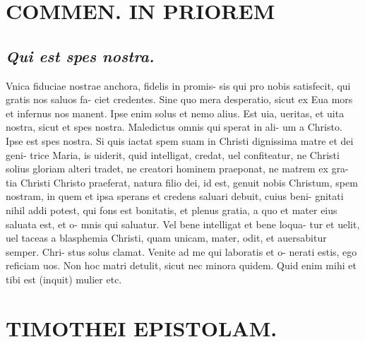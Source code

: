 \documentclass{article}
\begin{document}
\begin{pages}
\section*{COMMEN. IN PRIOREM }
\marginpar{[ p.6 ]}
{}
\subsection*{\textit{Qui est spes nostra. }}\pstart Vnica fiduciae nostrae anchora, fidelis in promis- sis qui pro nobis satisfecit, qui gratis nos saluos fa- ciet credentes. Sine quo mera desperatio, sicut ex Eua mors et infernus nos manent. Ipse enim solus et nemo alius. Est uia, ueritas, et uita nostra, sicut et spes nostra. Maledictus omnis qui sperat in ali- um a Christo. Ipse est spes nostra. Si quis iactat spem suam in Christi dignissima matre et dei geni- trice Maria, is uiderit, quid intelligat, credat, uel confiteatur, ne Christi solius gloriam alteri tradet, ne creatori hominem praeponat, ne matrem ex gra- tia Christi Christo praeferat, natura filio dei, id est, genuit nobis Christum, spem nostram, in quem et ipsa sperans et credens saluari debuit, cuius beni- gnitati nihil addi potest, qui fons est bonitatis, et plenus gratia, a quo et mater eius saluata est, et o- mnis qui saluatur. Vel bene intelligat et bene loqua- tur et uelit, uel taceas a blasphemia Christi, quam unicam, mater, odit, et auersabitur semper. Chri- stus solus clamat. Venite ad me qui laboratis et o- nerati estis, ego reficiam uos. Non hoc matri detulit, sicut nec minora quidem. Quid enim mihi et tibi est (inquit) mulier etc.  \pend
\section*{TIMOTHEI EPISTOLAM. }
\marginpar{[ p.7 ]}
{}

\end{pages}
\end{document}

